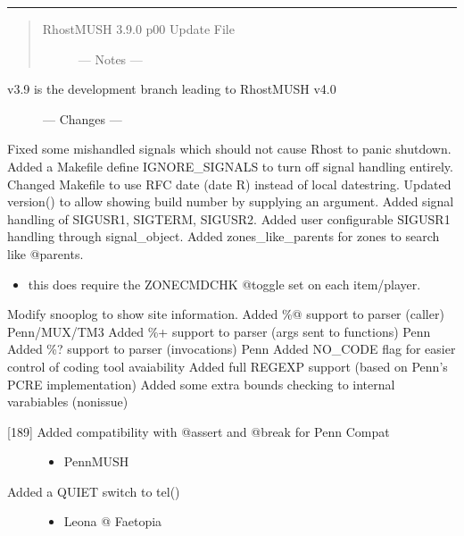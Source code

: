 \documentclass[letterpaper,10pt,english]{sphinxmanual}
\begin{document}
\bigskip\hrule\bigskip

\begin{quote}
\begin{description}
\item[{RhostMUSH 3.9.0 p00 Update File}] \leavevmode
\sphinxAtStartPar
—\sphinxhyphen{}  Notes  —\sphinxhyphen{}

\end{description}
\end{quote}
\begin{description}
\item[{v3.9 is the development branch leading to RhostMUSH v4.0}] \leavevmode
\sphinxAtStartPar
—\sphinxhyphen{} Changes —\sphinxhyphen{}

\end{description}

\sphinxAtStartPar
Fixed some mishandled signals which should not cause Rhost to panic shutdown.
Added a Makefile define IGNORE\_SIGNALS to turn off signal handling entirely.
Changed Makefile to use RFC date (date \sphinxhyphen{}R) instead of local datestring.
Updated version() to allow showing build number by supplying an argument.
Added signal handling of SIGUSR1, SIGTERM, SIGUSR2.
Added user configurable SIGUSR1 handling through signal\_object.
Added zones\_like\_parents for zones to search like @parents.
\begin{itemize}
\item {} 
\sphinxAtStartPar
this does require the ZONECMDCHK @toggle set on each item/player.

\end{itemize}

\sphinxAtStartPar
Modify snooplog to show site information.
Added \%@ support to parser (caller) \sphinxhyphen{} Penn/MUX/TM3
Added \%+ support to parser (args sent to functions) \sphinxhyphen{} Penn
Added \%? support to parser (invocations) \sphinxhyphen{} Penn
Added NO\_CODE flag for easier control of coding tool avaiability
Added full REGEXP support (based on Penn’s PCRE implementation)
Added some extra bounds checking to internal varabiables (non\sphinxhyphen{}issue)
\begin{description}
\item[{{[}18\sphinxhyphen{}9{]} Added compatibility with @assert and @break for Penn Compat}] \leavevmode\begin{itemize}
\item {} 
\sphinxAtStartPar
PennMUSH

\end{itemize}

\item[{Added a QUIET switch to tel()}] \leavevmode\begin{itemize}
\item {} 
\sphinxAtStartPar
Leona @ Faetopia

\end{itemize}

\end{description}
\end{document}
